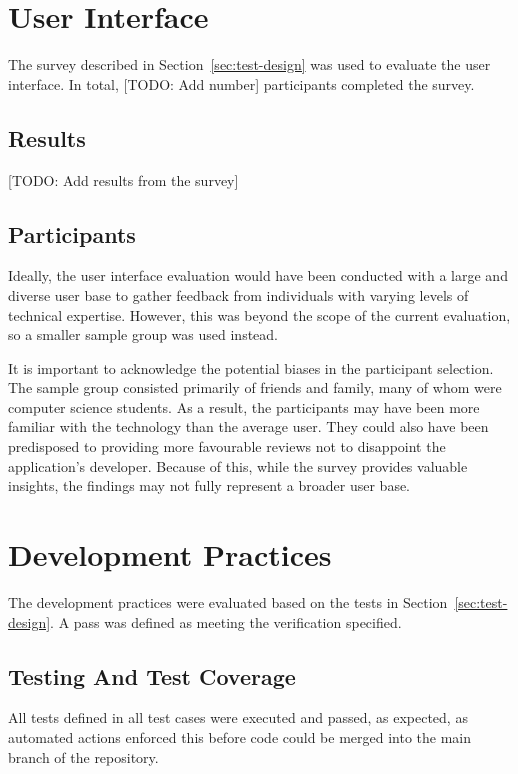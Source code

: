 \section{User Interface}
The survey described in Section~\ref{sec:test-design} was used to evaluate the user interface. In total, [TODO: Add number] participants completed the survey.

\subsection{Results}
[TODO: Add results from the survey]

\subsection{Participants}
Ideally, the user interface evaluation would have been conducted with a large and diverse user base to gather feedback from individuals with varying levels of technical expertise. However, this was beyond the scope of the current evaluation, so a smaller sample group was used instead.

It is important to acknowledge the potential biases in the participant selection. The sample group consisted primarily of friends and family, many of whom were computer science students. As a result, the participants may have been more familiar with the technology than the average user. They could also have been predisposed to providing more favourable reviews not to disappoint the application's developer. Because of this, while the survey provides valuable insights, the findings may not fully represent a broader user base.

\section{Development Practices}
The development practices were evaluated based on the tests in Section~\ref{sec:test-design}. A pass was defined as meeting the verification specified.

\subsection{Testing And Test Coverage}
All tests defined in all test cases were executed and passed, as expected, as automated actions enforced this before code could be merged into the main branch of the repository.

